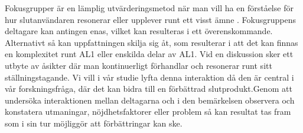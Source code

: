 Fokusgrupper är en lämplig utvärderingsmetod när man vill ha en förståelse för hur slutanvändaren resonerar eller upplever runt ett visst ämne \cite{MorganFocusGroups}. Fokusgruppens deltagare kan antingen enas, vilket kan resulteras i ett överenskommande. Alternativt så kan uppfattningen skilja sig åt, som resulterar i att det kan finnas en komplexitet runt AL1 eller enskilda delar av AL1. Vid en diskussion sker ett utbyte av åsikter där man kontinuerligt förhandlar och resonerar runt sitt ställningstagande. Vi vill i vår studie lyfta denna interaktion då den är central i vår forskningsfråga, där det kan bidra till en förbättrad slutprodukt\cite{VictoriaWibeck2010FokusgrupperUndersokningsmetod}.Genom att undersöka interaktionen mellan deltagarna och i den bemärkelsen observera och konstatera utmaningar, nöjdhetsfaktorer eller problem så kan resultat tas fram som i sin tur möjliggör att förbättringar kan ske. 
